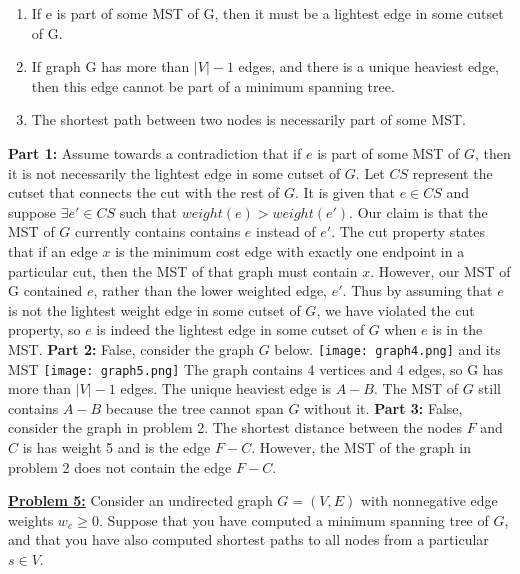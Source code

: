 \documentclass[11pt]{article}
\begin{document}
\begin{flushleft}
	\begin{enumerate}
		\item If e is part of some MST of G, then it must be a lightest edge
		in some cutset of G.
		\item If graph G has more than $|V | - 1$ edges, and there is a unique
		heaviest edge, then this edge cannot be part of a minimum spanning
		tree. 
		\item The shortest path between two nodes is necessarily part of some MST.
	\end{enumerate}
	\textbf{Part 1: }Assume towards a contradiction that if $e$ is part of some MST of $G$, then it is not necessarily the lightest edge in some cutset of $G$. Let $CS$ represent the cutset that connects the cut with the rest of $G$. It is given that $e \in CS$ and suppose $\exists  e' \in CS$ such that $weight(e) > weight(e')$. Our claim is that the MST of $G$ currently contains contains $e$ instead of $e'$. The cut property states that if an edge $x$ is the minimum cost edge with exactly one endpoint in a particular cut, then the MST of that graph must contain $x$. However, our MST of G contained $e$, rather than the lower weighted edge, $e'$. Thus by assuming that $e$ is not the lightest weight edge in some cutset of $G$, we have violated the cut property, so $e$ is indeed the lightest edge in some cutset of $G$ when $e$ is in the MST. 
	\newline
	\newline
	\textbf{Part 2: } False, consider the graph $G$ below. \newline
	\texttt{[image: graph4.png]} and its MST 
	\texttt{[image: graph5.png]} \newline
	The graph contains 4 vertices and 4 edges, so G has more than $|V| - 1$ edges. The unique heaviest edge is $A - B$. The MST of $G$ still contains $A - B$ because the tree cannot span $G$ without it. 
	\newline
	\newline
	\textbf{Part 3: } False, consider the graph in problem 2. The shortest distance between the nodes $F$ and $C$ is has weight 5 and is the edge $F - C$. However, the MST of the graph in problem 2 does not contain the edge $F - C$.  
	\newpage
	\item\textbf{\underline{Problem 5:}} Consider an undirected graph $G=(V,E)$ with nonnegative
	edge weights $w_e\ge 0$. Suppose that you have computed a
	minimum spanning tree of $G$, and that you have also
	computed shortest paths to all nodes from a particular
	$s\in V$.
	

\end{flushleft}
\end{document}
